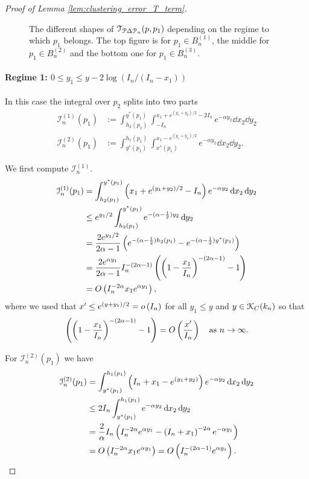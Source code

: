 \begin{proof}[Proof of Lemma \ref{lem:clustering_error_T_term}]
\begin{figure}[!tp]
\begin{tikzpicture}[scale=5]
\end{tikzpicture}
\caption{The different shapes of $\mathcal{T}_{\Pcal \Delta \Pcal_n}(p,p_1)$ depending on the regime to which $p_1$ belongs. The top figure is for $p_1 \in B_n^{(1)}$, the middle for $p_1 \in B_n^{(2)}$ and the bottom one for $p_1 \in B_n^{(3)}$.}
\label{fig:shapes_triangle_mismatches}
\end{figure}

\paragraph{Regime 1: $0 \le y_1 \le y - 2\log(I_n/(I_n-x_1))$}

In this case the integral over $p_2$ splits into two parts
\begin{align*}
	\mathcal{I}_n^{(1)}(p_1) &:= \int_{h_2(p_1)}^{y^\ast(p_1)} \int_{-I_n}^{x_1 + e^{(y_1+y_2)/2}-2I_n} e^{-\alpha y_2}
		\dd x_2 \dd y_2\\
	\mathcal{I}_n^{(2)}(p_1) &:= \int_{y^\ast(p_1)}^{h_1(p_1)} \int_{x^\ast(p_1)}^{x_1 - e^{(y_1+y_2)/2}} e^{-\alpha y_2}
		\dd x_2 \dd y_2.
\end{align*}

We first compute $\mathcal{I}_n^{(1)}$.
\begin{align*}
	\mathcal{I}_n^{(1)}(p_1) &= \int_{h_2(p_1)}^{y^\ast(p_1)} \left(x_1 + e^{(y_1+y_2)/2} - I_n\right) e^{-\alpha y_2} 
		\dd x_2 \dd y_2\\
	&\le e^{y_1/2} \int_{h_2(p_1)}^{y^\ast(p_1)} e^{-(\alpha-\frac{1}{2}) y_2} \dd y_2\\
	&= \frac{2 e^{y_1/2}}{2\alpha - 1} \left(e^{-(\alpha-\frac{1}{2})h_2(p_1)} - e^{-(\alpha-\frac{1}{2})y^\ast(p_1)}
		\right) \\
	&= \frac{2 e^{\alpha y_1}}{2\alpha - 1} I_n^{-(2\alpha -1)}\left(\left(1 - \frac{x_1}{I_n}\right)^{-(2\alpha - 1)}-1\right)\\
	&= \bigO{I_n^{-2\alpha} x_1 e^{\alpha y_1}},
\end{align*}
where we used that $x^\prime \le e^{(y+y_1)/2} = \smallO{I_n}$ for all $y_1\le y$ and $y \in \Kcal_{C}(k_n)$ so that
\[
	\left(\left(1 - \frac{x_1}{I_n}\right)^{-(2\alpha - 1)}-1\right) = \bigO{\frac{x^\prime}{I_n}} \quad 
	\text{as } n \to \infty.
\]

For $\mathcal{I}_n^{(2)}(p_1)$ we have
\begin{align*}
	\mathcal{I}_n^{(2)}(p_1) &= \int_{y^\ast(p_1)}^{h_1(p_1)} \left(I_n + x_1 - e^{(y_1+y_2)}\right) e^{-\alpha y_2}
		\dd x_2 \dd y_2\\
	&\le 2 I_n \int_{y^\ast(p_1)}^{h_1(p_1)} e^{-\alpha y_2} \dd x_2 \dd y_2\\
	&= \frac{2}{\alpha} I_n \left(I_n^{-2\alpha}e^{\alpha y_1} - \left(I_n + x_1\right)^{-2\alpha} e^{-\alpha y_1}\right)\\
	&= \bigO{I_n^{-2\alpha} x_1 e^{\alpha y_1}} = \bigO{I_n^{-(2\alpha - 1)} e^{\alpha y_1}}.
\end{align*}


\end{proof}
